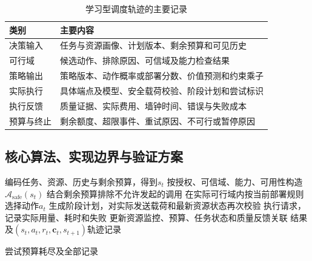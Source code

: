 \begin{table}[htbp]
\centering
\caption{学习型调度轨迹的主要记录}
\label{tab:scheduling-trace}
\begin{tabular}{p{}p{}}
\toprule
类别 & 主要内容 \\
\midrule
决策输入 & 任务与资源画像、计划版本、剩余预算和可见历史 \\
可行域 & 候选动作、排除原因、可信域及能力检查结果 \\
策略输出 & 策略版本、动作概率或部署分数、价值预测和约束乘子 \\
实际执行 & 具体端点及模型、安全载荷校验、阶段计划和尝试标识 \\
执行反馈 & 质量证据、实际费用、墙钟时间、错误与失败成本 \\
预算与终止 & 剩余额度、超限事件、重试原因、不可行或暂停原因 \\
\bottomrule
\end{tabular}
\end{table}

\subsection{核心算法、实现边界与验证方案}

\begin{algorithm}[htbp]
\caption{硬可行域约束下的资源调度与执行}
\label{alg:tide-placement}
编码任务、资源、历史与剩余预算，得到$s_t$\;
按授权、可信域、能力、可用性构造$\mathcal{A}_{\mathrm{safe}}(s_t)$\;
结合剩余预算排除不允许发起的调用\;
在实际可行域内按当前部署规则选择动作$a_t$\;
生成阶段计划，对实际发送载荷和最新资源状态再次校验\;
执行请求，记录实际用量、耗时和失败\;
更新资源监控、预算、任务状态和质量反馈关联\;
\Return 结果及$(s_t,a_t,r_t,\mathbf{c}_t,s_{t+1})$轨迹记录\;
\end{algorithm}

\begin{algorithm}[htbp]
\caption{累计预算约束下的有限重调度}
\label{alg:resilient-inference}
\Return 尝试预算耗尽及全部记录\;
\end{algorithm}

